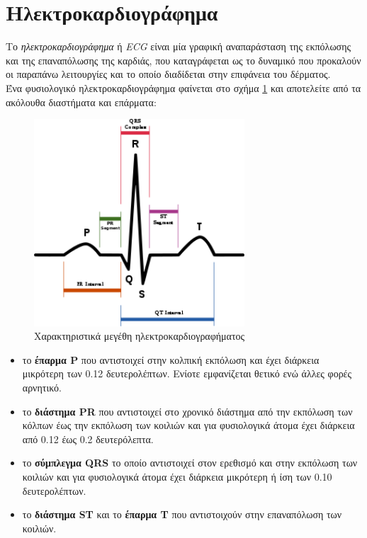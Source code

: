 \section{Ηλεκτροκαρδιογράφημα}
\justifying
Το \emph{ηλεκτροκαρδιογράφημα} ή \en \emph{ECG} \gr\cite{heart:26} είναι μία γραφική αναπαράσταση της εκπόλωσης και της επαναπόλωσης της καρδιάς, που καταγράφεται ως το δυναμικό που προκαλούν οι παραπάνω λειτουργίες και το οποίο διαδίδεται στην επιφάνεια του δέρματος.
\\[0.5 \baselineskip]
Ένα φυσιολογικό ηλεκτροκαρδιογράφημα φαίνεται στο σχήμα \ref{fig:2.4} και αποτελείτε από τα ακόλουθα διαστήματα και επάρματα:
\begin{figure}[H]
    \centering
    \includegraphics[width=0.7\textwidth]{misc/ECG.png}
    \caption{Χαρακτηριστικά μεγέθη ηλεκτροκαρδιογραφήματος}
    \label{fig:2.4}
\end{figure}
\begin{itemize}
    \item το \textbf{έπαρμα \en P\gr} που αντιστοιχεί στην κολπική εκπόλωση και έχει διάρκεια μικρότερη των 0.12 δευτερολέπτων. Ενίοτε εμφανίζεται θετικό ενώ άλλες φορές αρνητικό.
    \item το \textbf{διάστημα \en PR\gr} που αντιστοιχεί στο χρονικό διάστημα από την εκπόλωση των κόλπων έως την εκπόλωση των κοιλιών και για φυσιολογικά άτομα έχει διάρκεια από 0.12 έως 0.2 δευτερόλεπτα.
    \item το \textbf{σύμπλεγμα \en QRS\gr} το οποίο αντιστοιχεί στον ερεθισμό και στην εκπόλωση των κοιλιών και για φυσιολογικά άτομα έχει διάρκεια μικρότερη ή ίση των 0.10 δευτερολέπτων.
    \item το \textbf{διάστημα \en ST\gr} και το \textbf{έπαρμα \en T\gr} που αντιστοιχούν στην επαναπόλωση των κοιλιών. 
    
\end{itemize}
